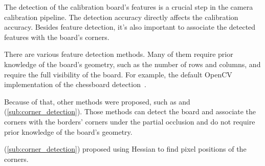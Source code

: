 The detection of the calibration board's features is a crucial step in the
camera calibration pipeline. The detection accuracy directly affects the
calibration accuracy. Besides feature detection, it's also important to
associate the detected features with the board's corners.

There are various feature detection methods. Many of them require
prior knowledge of the board's geometry, such as the number of rows and columns,
and require the full visibility of the board. For example, the default OpenCV
implementation of the chessboard detection~\citep{OpenCVCameraCalibration}.

Because of that, other methods were proposed, such as
\cite{fuersattelOCPADOccludedCheckerboard2016} and
\cite{geigerAutomaticCameraRange2012} (\cref{sub:corner_detection}). Those methods can detect the board and
associate the corners with the borders' corners under
the partial occlusion and do not require prior knowledge of the board's geometry.

\cite{chenNewSubPixelDetector2005} (\cref{sub:corner_detection}) proposed using Hessian to find pixel
positions of the corners.
